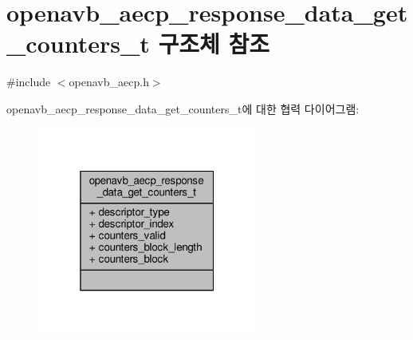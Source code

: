 \hypertarget{structopenavb__aecp__response__data__get__counters__t}{}\section{openavb\+\_\+aecp\+\_\+response\+\_\+data\+\_\+get\+\_\+counters\+\_\+t 구조체 참조}
\label{structopenavb__aecp__response__data__get__counters__t}


{\ttfamily \#include $<$openavb\+\_\+aecp.\+h$>$}



openavb\+\_\+aecp\+\_\+response\+\_\+data\+\_\+get\+\_\+counters\+\_\+t에 대한 협력 다이어그램\+:
\nopagebreak
\begin{figure}[H]
\begin{center}
\leavevmode
\includegraphics[width=205pt]{structopenavb__aecp__response__data__get__counters__t__coll__graph}
\end{center}
\end{figure}
